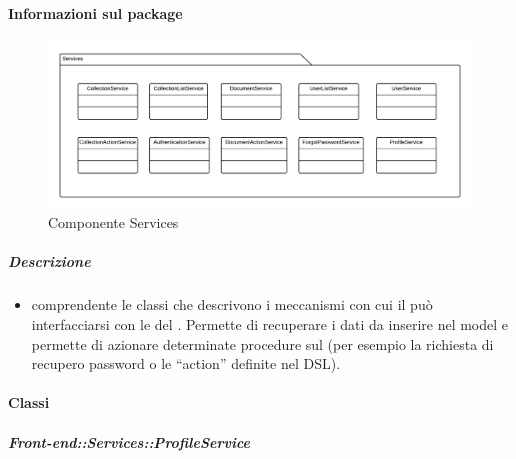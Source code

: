   \paragraph{Informazioni sul package}
    \begin{figure}[H] 
      \begin{center} 
        \includegraphics[width=\textwidth]{packages/Front-end::Services.png}  
        \caption{Componente Services}
      \end{center}  
    \end{figure} 
  \subparagraph{Descrizione} 
    \begin{itemize}
    \item[]  comprendente le classi che descrivono i meccanismi con cui il  può interfacciarsi con le  del . Permette di recuperare i dati da inserire nel model e permette di azionare determinate procedure sul  (per esempio la richiesta di recupero password o le ``action'' definite nel DSL).
    \end{itemize} 
    \paragraph{Classi}
      \subparagraph{Front-end::Services::ProfileService}
        
